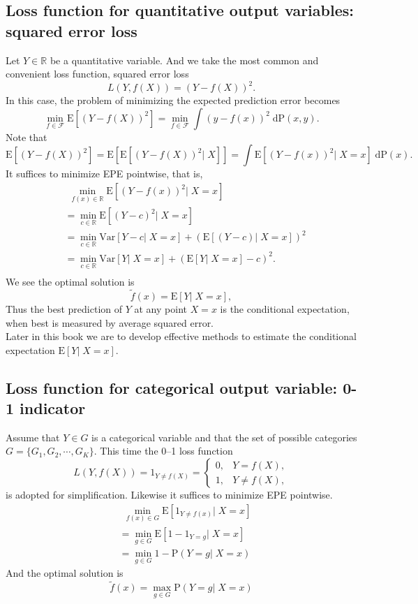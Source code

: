 \documentclass{report}
\theoremstyle{nonumberplain}
\newcommand{\0}{\mathbf{0}}
\begin{document}
\subsection{Loss function for quantitative output variables: squared error loss}
Let $Y\in\mathbb{R}$ be a quantitative variable. And we take the most
common and convenient loss function, squared error loss
\[
L(Y,f(X))=(Y-f(X))^2.
\]
In this case, the problem of minimizing the expected prediction error becomes
\[
\min_{f\in\mathcal{F}}\mathrm{E}[(Y-f(X))^2]=\min_{f\in\mathcal{F}}\int (y-f(x))^2\;\mathrm{dP}(x,y).
\]
Note that
\[\mathrm{E}[(Y-f(X))^2]=\mathrm{E}[\mathrm{E}[(Y-f(X))^2|\; X]]=\int\mathrm{E}[(Y-f(x))^2|\; X=x]\;\mathrm{dP}(x).\]
It suffices to minimize EPE pointwise, that is, 
\begin{align*}
&\ \ \min_{f(x)\in\mathbb{R}}\mathrm{E}[(Y-f(x))^2|\; X=x]\\
&=\min_{c\in\mathbb{R}}\mathrm{E}[(Y-c)^2|\; X=x]\\
&=\min_{c\in\mathbb{R}}\mathrm{Var}[Y-c|\; X=x]+(\mathrm{E}[(Y-c)|\; X=x])^2\\
&=\min_{c\in\mathbb{R}}\mathrm{Var}[Y|\; X=x]+(\mathrm{E}[Y|\; X=x]-c)^2.\\
\end{align*}
We see the optimal solution is
\[
\tilde{f}(x) = \mathrm{E}[Y|\; X=x],
\]
Thus the best prediction of $Y$ at any point $X = x$ is the conditional expectation, when best is measured by average squared error. \\
Later in this book we are to develop effective methods to estimate the conditional expectation $\mathrm{E}[Y|\; X=x]$.
\subsection{Loss function for categorical output variable: 0-1 indicator}
Assume that $Y\in G$ is a categorical variable and that the set of possible categories $G=\{G_1,G_2,\cdots,G_K\}$. This time the 0–1 loss function 
\[
L(Y,f(X))=1_{Y\ne f(X)}=
\begin{cases}
0,&Y=f(X),\\
1,&Y\ne f(X),
\end{cases}
\]
is adopted for simplification. Likewise it suffices to minimize EPE pointwise.
\begin{align*}
&\ \ \min_{f(x)\in G}\mathrm{E}[1_{Y\ne f(x)}|\; X=x]\\
&=\min_{g\in G}\mathrm{E}[1-1_{Y=g}|\; X=x]\\
&=\min_{g\in G}1-\mathrm{P}(Y=g|\; X=x)
\end{align*}
And the optimal solution is
\[
\tilde{f}(x)=\max_{g\in G} \mathrm{P}(Y=g|\; X=x)
\]
\end{document}
